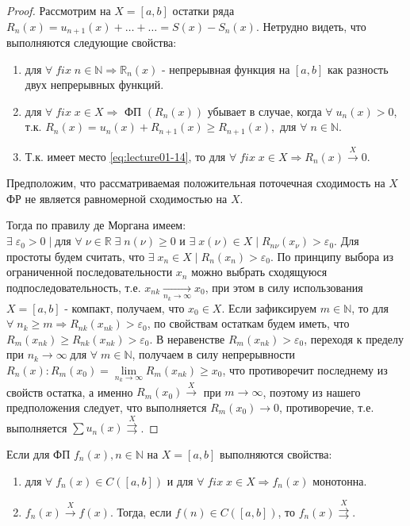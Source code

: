 \begin{proof}
	Рассмотрим на $X = [a,b]$ остатки ряда $R_n(x) = u_{n+1}(x) + \ldots + \ldots = S(x) - S_n(x)$.	Нетрудно видеть, что выполняются следующие свойства:
	\begin{enumerate}
		\item для $\forall \; fix \; n \in \mathbb{N} \Rightarrow \mathbb{R}_n (x)$ - непрерывная функция на $[a,b]$ как разность двух непрерывных функций.
		\item для $\forall \; fix \; x \in X \Rightarrow$ $\text{ФП}$ $(R_n(x))$ убывает в случае, когда $\forall \; u_n (x) > 0$, т.к. \newline $R_n(x) = u_n(x) + R_{n+1}(x) \geqslant R_{n+1}(x), \text{ для } \forall \; n \in \mathbb{N}$.
		\item Т.к. имеет место \eqref{eq:lecture01-14}, то для $\forall \; fix \; x \in X \Rightarrow R_n(x) \overset{X}{\to} 0$.
	\end{enumerate}
	Предположим, что рассматриваемая положительная поточечная сходимость на $X$ ФР не является равномерной сходимостью на $X$.

	Тогда по правилу де Моргана имеем: $\exists \; \varepsilon_0 > 0 \; | \; \text{для } \forall \; \nu \in \mathbb{R} \; \exists \; n (\nu) \geqslant 0 \text{ и } \exists \; x (\nu) \in X \; | \; R_{n \nu} (x_\nu) > \varepsilon_0$. Для простоты будем считать, что $\exists \; x_n \in X \; | \; R_n (x_n) > \varepsilon_0$. По принципу выбора из ограниченной последовательности $x_n$ можно выбрать сходящуюся подпоследовательность, т.е. $x_{nk} \underset{n_k \to \infty}{\longrightarrow} x_0$, при этом в силу использования $X = [a,b]$ - компакт, получаем, что $x_0 \in X$. Если зафиксируем $m \in \mathbb{N}$, то для $\forall \; n_k \geqslant m \Rightarrow R_{nk} 	(x_{nk}) > \varepsilon_0$, по свойствам остаткам будем иметь, что $R_{m} (x_{nk}) \geqslant R_{nk} (x_{nk}) > \varepsilon_0$. В неравенстве $R_m (x_{nk}) > \varepsilon_0$, переходя к пределу при $n_k \to \infty \; \text{для } \forall \; m \in \mathbb{N}$, получаем в силу непрерывности $R_n(x): R_m (x_0) = \lim\limits_{n_k \to \infty} R_m(x_{nk}) \geqslant x_0$, что противоречит последнему из свойств остатка, а именно $R_m(x_0) \overset{X}{\longrightarrow}$ при $m \to \infty$, поэтому из нашего предположения следует, что выполняется $R_m(x_0) \to 0$, противоречие, т.е. выполняется $\sum u_n(x) \overset{X}{\rightrightarrows}$.
\end{proof}
\begin{consequence}
	Если для ФП $f_n(x), n \in \mathbb{N}$ на $X = [a,b]$ выполняются свойства:
	\begin{enumerate}
		\item для $\forall \; f_n(x) \in C([a,b])$ и для	 $\forall \; fix \; x \in X \Rightarrow f_n(x)$ монотонна.
		\item $f_n(x) 	\overset{X}{\longrightarrow}f(x)$. Тогда, если $f(n) \in C([a,b])$, то $f_n(x) \overset{X}{\rightrightarrows}$.
	\end{enumerate}
\end{consequence}
